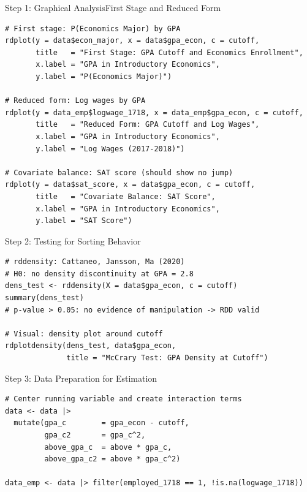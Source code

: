 \documentclass[hyperref={pdfpagelabels=false}]{beamer}
\begin{document}
\begin{frame}[fragile]{Step 1: Graphical Analysis}{First Stage and Reduced Form}
\begin{lstlisting}[style=r-style]
# First stage: P(Economics Major) by GPA
rdplot(y = data$econ_major, x = data$gpa_econ, c = cutoff,
       title   = "First Stage: GPA Cutoff and Economics Enrollment",
       x.label = "GPA in Introductory Economics",
       y.label = "P(Economics Major)")

# Reduced form: Log wages by GPA
rdplot(y = data_emp$logwage_1718, x = data_emp$gpa_econ, c = cutoff,
       title   = "Reduced Form: GPA Cutoff and Log Wages",
       x.label = "GPA in Introductory Economics",
       y.label = "Log Wages (2017-2018)")

# Covariate balance: SAT score (should show no jump)
rdplot(y = data$sat_score, x = data$gpa_econ, c = cutoff,
       title   = "Covariate Balance: SAT Score",
       x.label = "GPA in Introductory Economics",
       y.label = "SAT Score")
\end{lstlisting}
\end{frame}


\begin{frame}[fragile]{Step 2: Testing for Sorting Behavior}
\begin{lstlisting}[style=r-style]
# rddensity: Cattaneo, Jansson, Ma (2020)
# H0: no density discontinuity at GPA = 2.8
dens_test <- rddensity(X = data$gpa_econ, c = cutoff)
summary(dens_test)
# p-value > 0.05: no evidence of manipulation -> RDD valid

# Visual: density plot around cutoff
rdplotdensity(dens_test, data$gpa_econ,
              title = "McCrary Test: GPA Density at Cutoff")
\end{lstlisting}
\end{frame}


\begin{frame}[fragile]{Step 3: Data Preparation for Estimation}
\begin{lstlisting}[style=r-style]
# Center running variable and create interaction terms
data <- data |>
  mutate(gpa_c        = gpa_econ - cutoff,
         gpa_c2       = gpa_c^2,
         above_gpa_c  = above * gpa_c,
         above_gpa_c2 = above * gpa_c^2)

data_emp <- data |> filter(employed_1718 == 1, !is.na(logwage_1718))
\end{lstlisting}
\end{frame}
\end{document}
